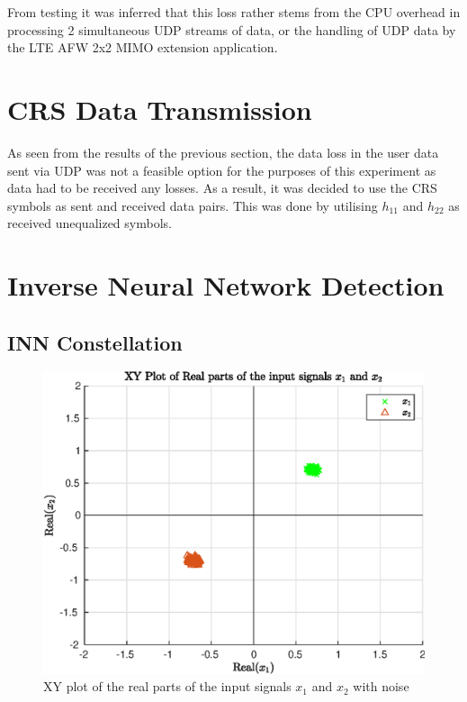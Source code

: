 From testing it was inferred that this loss rather stems from the CPU overhead in processing 2 simultaneous UDP streams of data, or the handling of UDP data by the LTE AFW 2x2 MIMO extension application.

\section{CRS Data Transmission}\label{sec:CRSDataVisualisation}
As seen from the results of the previous section, the data loss in the user data sent via UDP was not a feasible option for the purposes of this experiment as data had to be received any losses. As a result, it was decided to use the CRS symbols as sent and received data pairs. This was done by utilising $h_{11}$ and $h_{22}$ as received unequalized symbols.

\section{Inverse Neural Network Detection}\label{sec:INNDet}

\subsection{INN Constellation}\label{ssec:INNConstellation}

\begin{figure}[!htb]
    \centering
    \includegraphics[width=\linewidth]{images/INNxn.eps}
    \caption{XY plot of the real parts of the input signals $x_1$ and $x_2$ with noise}
    \label{fig:INNxn}
\end{figure}

